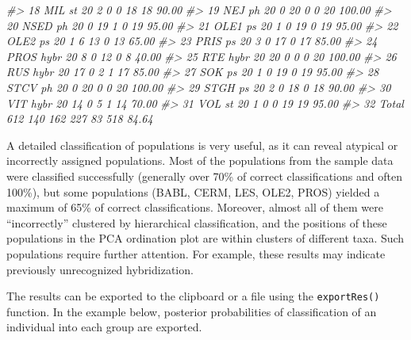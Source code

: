 \documentclass[
  11pt,
  a4paper]{article}
\newenvironment{Shaded}{\begin{snugshade}}{\end{snugshade}}
\newcommand{\CommentTok}[1]{\textcolor[rgb]{0.56,0.35,0.01}{\textit{#1}}}
\begin{document}
\begin{Shaded}
\begin{Highlighting}[]
\CommentTok{\#\textgreater{} 18        MIL    st  20       2     0     0    18      18      90.00}
\CommentTok{\#\textgreater{} 19        NEJ    ph  20       0    20     0     0      20     100.00}
\CommentTok{\#\textgreater{} 20       NSED    ph  20       0    19     1     0      19      95.00}
\CommentTok{\#\textgreater{} 21       OLE1    ps  20       1     0    19     0      19      95.00}
\CommentTok{\#\textgreater{} 22       OLE2    ps  20       1     6    13     0      13      65.00}
\CommentTok{\#\textgreater{} 23       PRIS    ps  20       3     0    17     0      17      85.00}
\CommentTok{\#\textgreater{} 24       PROS  hybr  20       8     0    12     0       8      40.00}
\CommentTok{\#\textgreater{} 25        RTE  hybr  20      20     0     0     0      20     100.00}
\CommentTok{\#\textgreater{} 26        RUS  hybr  20      17     0     2     1      17      85.00}
\CommentTok{\#\textgreater{} 27        SOK    ps  20       1     0    19     0      19      95.00}
\CommentTok{\#\textgreater{} 28       STCV    ph  20       0    20     0     0      20     100.00}
\CommentTok{\#\textgreater{} 29       STGH    ps  20       2     0    18     0      18      90.00}
\CommentTok{\#\textgreater{} 30        VIT  hybr  20      14     0     5     1      14      70.00}
\CommentTok{\#\textgreater{} 31        VOL    st  20       1     0     0    19      19      95.00}
\CommentTok{\#\textgreater{} 32      Total       612     140   162   227    83     518      84.64}
\end{Highlighting}
\end{Shaded}

A detailed classification of populations is very useful, as it can
reveal atypical or incorrectly assigned populations. Most of the
populations from the sample data were classified successfully (generally
over 70\% of correct classifications and often 100\%), but some
populations (BABL, CERM, LES, OLE2, PROS) yielded a maximum of 65\% of
correct classifications. Moreover, almost all of them were
``incorrectly'' clustered by hierarchical classification, and the
positions of these populations in the PCA ordination plot are within
clusters of different taxa. Such populations require further attention.
For example, these results may indicate previously unrecognized
hybridization.

The results can be exported to the clipboard or a file using the
\texttt{exportRes()} function. In the example below, posterior
probabilities of classification of an individual into each group are
exported.
\end{document}
